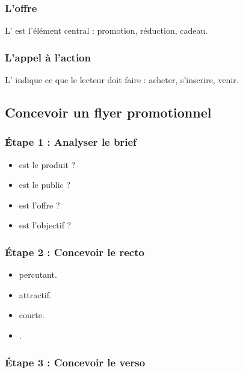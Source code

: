 \subsubsection{L'offre}

L' est l'élément central : promotion, réduction, cadeau.

\subsubsection{L'appel à l'action}

L' indique ce que le lecteur doit faire : acheter, s'inscrire, venir.

\subsection{Concevoir un flyer promotionnel}

\subsubsection{Étape 1 : Analyser le brief}

\begin{itemize}
    \item {} est le produit ?
    \item {} est le public ?
    \item {} est l'offre ?
    \item {} est l'objectif ?
\end{itemize}

\subsubsection{Étape 2 : Concevoir le recto}

\begin{itemize}
    \item {} percutant.
    \item {} attractif.
    \item {} courte.
    \item {}.
\end{itemize}

\subsubsection{Étape 3 : Concevoir le verso}

